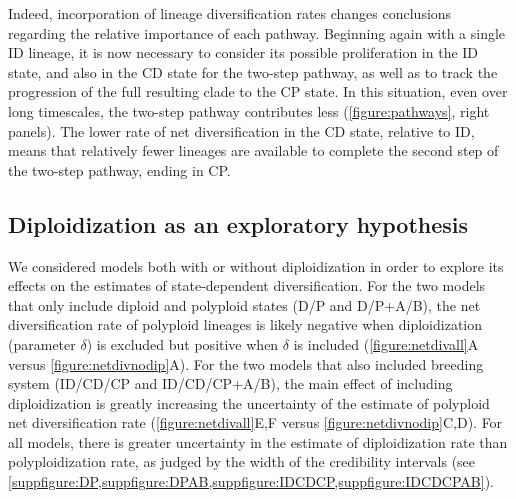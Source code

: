 Indeed, incorporation of lineage diversification rates changes conclusions regarding the relative importance of each pathway.
Beginning again with a single ID lineage, it is now necessary to consider its possible proliferation in the ID state, and also in the CD state for the two-step pathway, as well as to track the progression of the full resulting clade to the CP state.
In this situation, even over long timescales, the two-step pathway contributes less (\cref{figure:pathways}, right panels).
The lower rate of net diversification in the CD state, relative to ID, means that relatively fewer lineages are available to complete the second step of the two-step pathway, ending in CP.

\subsection{Diploidization as an exploratory hypothesis}

We considered models both with or without diploidization in order to explore its effects on the estimates of state-dependent diversification.
For the two models that only include diploid and polyploid states (D/P and D/P+A/B), the net diversification rate of polyploid lineages is likely negative when diploidization (parameter $\delta$) is excluded but positive when $\delta$ is included (\cref{figure:netdivall}A versus \cref{figure:netdivnodip}A).
For the two models that also included breeding system (ID/CD/CP and ID/CD/CP+A/B), the main effect of including diploidization is greatly increasing the uncertainty of the estimate of polyploid net diversification rate (\cref{figure:netdivall}E,F versus \cref{figure:netdivnodip}C,D).
For all models, there is greater uncertainty in the estimate of diploidization rate than polyploidization rate, as judged by the width of the credibility intervals (see \cref{suppfigure:DP,suppfigure:DPAB,suppfigure:IDCDCP,suppfigure:IDCDCPAB}).

